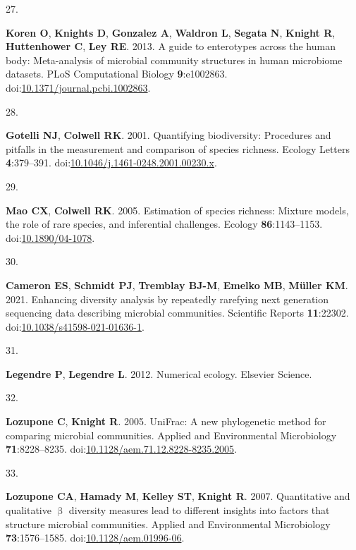 \documentclass[
]{article}
\newlength{\cslhangindent}
\newlength{\csllabelwidth}
\newlength{\cslentryspacingunit} %
\newenvironment{CSLReferences}[2] %
 {%
  \setlength{\parindent}{0pt}
  \ifodd #1
  \let\oldpar\par
  \def\par{\hangindent=\cslhangindent\oldpar}
  \fi
  \setlength{\parskip}{#2\cslentryspacingunit}
 }%
 {}
\newcommand{\CSLLeftMargin}[1]{\parbox[t]{\csllabelwidth}{#1}}
\newcommand{\CSLRightInline}[1]{\parbox[t]{\linewidth - \csllabelwidth}{#1}\break}
\begin{document}
\begin{CSLReferences}{0}{1}
\leavevmode{}%
\CSLLeftMargin{27. }%
\CSLRightInline{\textbf{Koren O}, \textbf{Knights D}, \textbf{Gonzalez
A}, \textbf{Waldron L}, \textbf{Segata N}, \textbf{Knight R},
\textbf{Huttenhower C}, \textbf{Ley RE}. 2013. A guide to enterotypes
across the human body: Meta-analysis of microbial community structures
in human microbiome datasets. {PLoS} Computational Biology
\textbf{9}:e1002863.
doi:\href{https://doi.org/10.1371/journal.pcbi.1002863}{10.1371/journal.pcbi.1002863}.}

\leavevmode{}%
\CSLLeftMargin{28. }%
\CSLRightInline{\textbf{Gotelli NJ}, \textbf{Colwell RK}. 2001.
Quantifying biodiversity: Procedures and pitfalls in the measurement and
comparison of species richness. Ecology Letters \textbf{4}:379--391.
doi:\href{https://doi.org/10.1046/j.1461-0248.2001.00230.x}{10.1046/j.1461-0248.2001.00230.x}.}

\leavevmode{}%
\CSLLeftMargin{29. }%
\CSLRightInline{\textbf{Mao CX}, \textbf{Colwell RK}. 2005. Estimation
of species richness: Mixture models, the role of rare species, and
inferential challenges. Ecology \textbf{86}:1143--1153.
doi:\href{https://doi.org/10.1890/04-1078}{10.1890/04-1078}.}

\leavevmode{}%
\CSLLeftMargin{30. }%
\CSLRightInline{\textbf{Cameron ES}, \textbf{Schmidt PJ},
\textbf{Tremblay BJ-M}, \textbf{Emelko MB}, \textbf{Müller KM}. 2021.
Enhancing diversity analysis by repeatedly rarefying next generation
sequencing data describing microbial communities. Scientific Reports
\textbf{11}:22302.
doi:\href{https://doi.org/10.1038/s41598-021-01636-1}{10.1038/s41598-021-01636-1}.}

\leavevmode{}%
\CSLLeftMargin{31. }%
\CSLRightInline{\textbf{Legendre P}, \textbf{Legendre L}. 2012.
Numerical ecology. Elsevier Science.}

\leavevmode{}%
\CSLLeftMargin{32. }%
\CSLRightInline{\textbf{Lozupone C}, \textbf{Knight R}. 2005. {UniFrac}:
A new phylogenetic method for comparing microbial communities. Applied
and Environmental Microbiology \textbf{71}:8228--8235.
doi:\href{https://doi.org/10.1128/aem.71.12.8228-8235.2005}{10.1128/aem.71.12.8228-8235.2005}.}

\leavevmode{}%
\CSLLeftMargin{33. }%
\CSLRightInline{\textbf{Lozupone CA}, \textbf{Hamady M}, \textbf{Kelley
ST}, \textbf{Knight R}. 2007. Quantitative and qualitative \(\upbeta\)
diversity measures lead to different insights into factors that
structure microbial communities. Applied and Environmental Microbiology
\textbf{73}:1576--1585.
doi:\href{https://doi.org/10.1128/aem.01996-06}{10.1128/aem.01996-06}.}


\end{CSLReferences}
\end{document}
